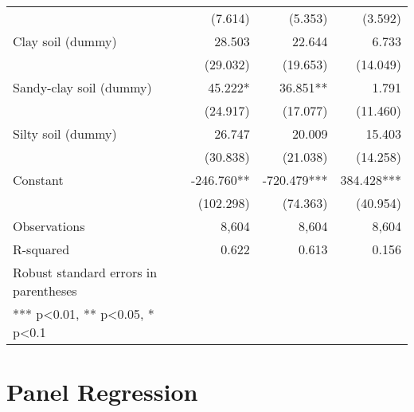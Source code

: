 \documentclass[
]{article}
\begin{document}
\begin{longtable}[t]{lrrr}
 & (7.614) & (5.353) & (3.592)\\
\addlinespace
Clay soil (dummy) & 28.503 & 22.644 & 6.733\\
 & (29.032) & (19.653) & (14.049)\\
Sandy-clay soil (dummy) & 45.222* & 36.851** & 1.791\\
 & (24.917) & (17.077) & (11.460)\\
Silty soil (dummy) & 26.747 & 20.009 & 15.403\\
\addlinespace
 & (30.838) & (21.038) & (14.258)\\
Constant & -246.760** & -720.479*** & 384.428***\\
 & (102.298) & (74.363) & (40.954)\\
Observations & 8,604 & 8,604 & 8,604\\
R-squared & 0.622 & 0.613 & 0.156\\
\addlinespace
Robust standard errors in parentheses &  &  & \\
*** p<0.01, ** p<0.05, * p<0.1 &  &  & \\*
\end{longtable}
\endgroup{}
\newpage

\hypertarget{panel-regression}{%
\section{Panel Regression}\label{panel-regression}}

\begingroup\fontsize{7}{9}\selectfont
\end{document}
